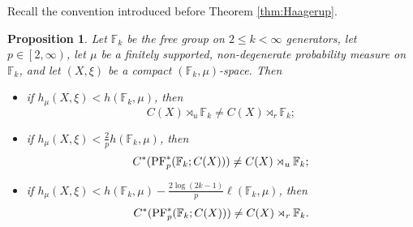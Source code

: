 \documentclass[12pt]{amsart}
\newtheorem{prop}[thm]{Proposition}
\theoremstyle{definition}
\theoremstyle{remark}
\numberwithin{equation}{section}
\newcommand{\F}{\mathbb{F}}
\begin{document}
Recall the convention introduced before Theorem \ref{thm:Haagerup}.

\begin{prop}\label{P:disticts PF crossed product}
    Let $\F_k$ be the free group on $2 \le k <\infty$ generators, let $p\in \left[2,\infty\right)$, let $\mu$ be a finitely supported, non-degenerate probability measure on $\F_k$, and let $(X,\xi)$ be a compact $(\F_k,\mu)$-space. Then
    \begin{itemize}
   \item[(i)] if $h_\mu(X,\xi)<h(\F_k,\mu)$, then $$C(X)\rtimes_u \F_k \neq C(X)\rtimes_r \F_k;$$
      \item[(ii)] if $h_\mu(X,\xi)<\frac{2}{p} h(\F_k,\mu)$, then $$C^*(\textup{PF}^*_p(\F_k;C(X))) \neq C(X)\rtimes_u \F_k;$$
      \item[(iii)]  if $h_\mu(X,\xi)<h(\F_k,\mu)-\frac{2\log (2k-1)}{p}\ell(\F_k,\mu)$, %
     then $$C^*(\textup{PF}^*_p(\F_k;C(X))) \neq C(X)\rtimes_r \F_k.$$
     \end{itemize}
\end{prop}
\end{document}
